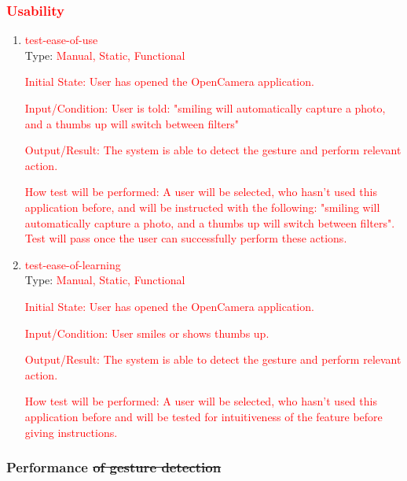 \documentclass[12pt, titlepage]{article}
\begin{document}
\subsubsection{\textcolor{red}{Usability}}
\begin{enumerate}

\item{\textcolor{red}{test-ease-of-use}\\}
Type: \textcolor{red}{Manual, Static, Functional}
					
\textcolor{red}{Initial State: User has opened the OpenCamera application.}
				
\textcolor{red}{Input/Condition: User is told: "smiling will automatically capture a photo, and a thumbs up will switch between filters"}
					
\textcolor{red}{Output/Result: The system is able to detect the gesture and perform relevant action.}
					
\textcolor{red}{How test will be performed: A user will be selected, who hasn't used this application before, and will be instructed with the following: "smiling will automatically capture a photo, and a thumbs up will switch between filters". Test will pass once the user can successfully perform these actions.}

\item{\textcolor{red}{test-ease-of-learning}\\}
Type: \textcolor{red}{Manual, Static, Functional}
					
\textcolor{red}{Initial State: User has opened the OpenCamera application.}
				
\textcolor{red}{Input/Condition: User smiles or shows thumbs up.}
					
\textcolor{red}{Output/Result: The system is able to detect the gesture and perform relevant action.}
					
\textcolor{red}{How test will be performed: A user will be selected, who hasn't used this application before and will be tested for intuitiveness of the feature before giving instructions.}
\end{enumerate}



\subsubsection{Performance \sout{of gesture detection}}
\end{document}
